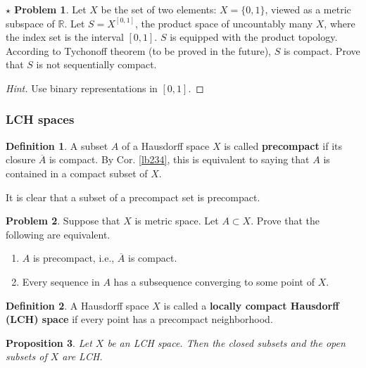\documentclass[12pt,b5paper,notitlepage]{article}
\theoremstyle{definition}
\newtheorem{df}{Definition}[section]
\newtheorem{prob}{\color{red}Problem}[section]
\newtheorem{sprob}[prob]{\color{red}$\star$ Problem}
\theoremstyle{plain}
\newtheorem{pp}[df]{Proposition}
\newcommand{\ovl}{\overline}
\newcommand{\Rbb}{\mathbb R}
\numberwithin{equation}{section}
\begin{document}
\begin{sprob}
Let $X$ be the set of two elements: $X=\{0,1\}$, viewed as a metric subspace of $\Rbb$. Let $S=X^{[0,1]}$, the product space of uncountably many $X$, where the index set is the  interval $[0,1]$. $S$ is equipped with the product topology. According to Tychonoff theorem (to be proved in the future), $S$ is compact. Prove that $S$ is not sequentially compact.
\end{sprob}


\begin{proof}[Hint]
Use binary representations in $[0,1]$.
\end{proof}




\subsubsection{LCH spaces}


\begin{df}
A subset $A$ of a Hausdorff space $X$ is called \textbf{precompact}  if its closure $\ovl A$ is compact. By Cor. \ref{lb234}, this is equivalent to saying that $A$ is contained in a compact subset of $X$.   
\end{df}

It is clear that a subset of a precompact set is precompact.

\begin{prob}\label{lb287}
Suppose that $X$ is metric space. Let $A\subset X$. Prove that the following are equivalent.
\begin{enumerate}[label=(\arabic*)]
\item $A$ is precompact, i.e., $\ovl A$ is compact.
\item Every sequence in $A$ has a subsequence converging to some point of $X$.
\end{enumerate}
\end{prob}



\begin{df}
A Hausdorff space $X$ is called a \textbf{locally compact Hausdorff (LCH) space}  if every point has a precompact neighborhood.
\end{df}






\begin{pp}\label{lb245}
Let $X$ be an LCH space. Then the closed subsets and the open subsets of $X$ are LCH. 
\end{pp}
\end{document}
